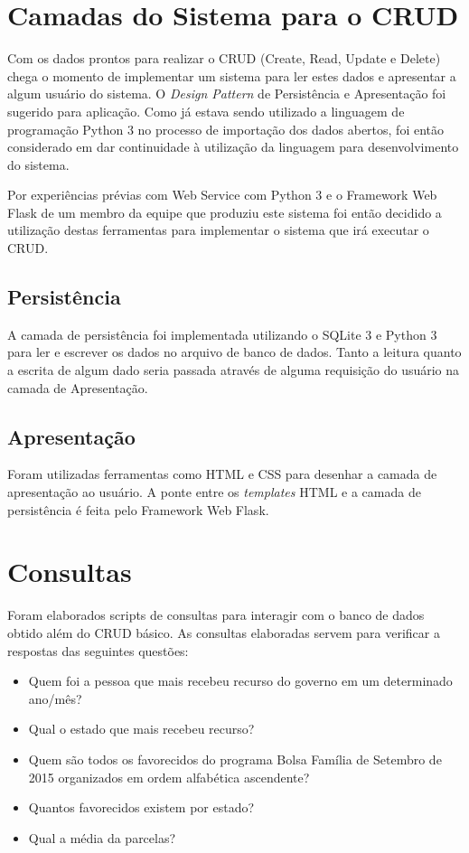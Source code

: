 \documentclass[12pt]{article}
\begin{document}
	\section{Camadas do Sistema para o CRUD}
	\label{sec:camadas}
	
	Com os dados prontos para realizar o CRUD (Create, Read, Update e Delete) chega o momento de implementar um sistema para ler estes dados e apresentar a algum usuário do sistema. O \textit{Design Pattern} de Persistência e Apresentação foi sugerido para aplicação. Como já estava sendo utilizado a linguagem de programação Python 3 no processo de importação dos dados abertos, foi então considerado em dar continuidade à utilização da linguagem para desenvolvimento do sistema.
	
	Por experiências prévias com Web Service com Python 3 e o Framework Web Flask de um membro da equipe que produziu este sistema foi então decidido a utilização destas ferramentas para implementar o sistema que irá executar o CRUD.
	
	\subsection{Persistência}
	\label{sec:pers}
	
	A camada de persistência foi implementada utilizando o SQLite 3 e Python 3 para ler e escrever os dados no arquivo de banco de dados. Tanto a leitura quanto a escrita de algum dado seria passada através de alguma requisição do usuário na camada de Apresentação.
	
	\subsection{Apresentação}
	\label{sec:apt}
	
	Foram utilizadas ferramentas como HTML e CSS para desenhar a camada de apresentação ao usuário. A ponte entre os \textit{templates} HTML e a camada de persistência é feita pelo Framework Web Flask.
	
	\section{Consultas} 
	\label{sec:consultas}
	
	Foram elaborados scripts de consultas para interagir com o banco de dados obtido além do CRUD básico. As consultas elaboradas servem para verificar a respostas das seguintes questões:
	
	\begin{itemize}
		\item Quem foi a pessoa que mais recebeu recurso do governo em um determinado ano/mês?
		\item Qual o estado que mais recebeu recurso?
		\item Quem são todos os favorecidos do programa Bolsa Família de Setembro de 2015 organizados em ordem alfabética ascendente?
		\item Quantos favorecidos existem por estado?
		\item Qual a média da parcelas?
	\end{itemize}
	
\end{document}
